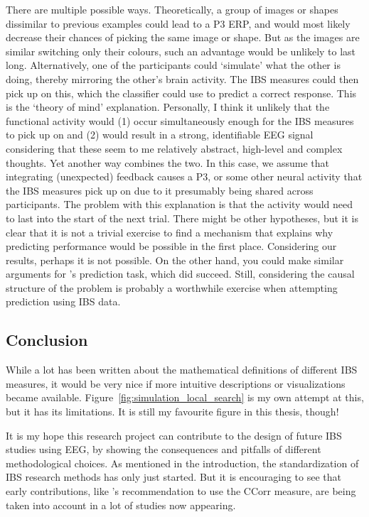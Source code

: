 There are multiple possible ways. Theoretically, a group of images or shapes dissimilar to
previous examples could lead to a P3 ERP, and would most likely decrease their
chances of picking the same image or shape. But as the images are similar switching only
their colours, such an advantage would be unlikely to last long. Alternatively,
one of the participants could `simulate' what the other is doing, thereby
mirroring the other's brain activity. The IBS measures could then pick up on
this, which the classifier could use to predict a correct response. This is the
`theory of mind' explanation. Personally, I think it unlikely that the
functional activity would (1) occur simultaneously enough for the IBS measures
to pick up on and (2) would result in a strong, identifiable EEG signal
considering that these seem to me relatively abstract, high-level and complex
thoughts. Yet another way combines the two. In this case, we assume that
integrating (unexpected) feedback causes a P3, or some other neural activity
that the IBS measures pick up on due to it presumably being shared across
participants. The problem with this explanation is that the activity would need
to last into the start of the next trial. There might be other hypotheses, but
it is clear that it is not a trivial exercise to find a mechanism that explains
why predicting performance would be possible in the first place. Considering
our results, perhaps it is not possible. On the other hand, you could make similar
arguments for \textcite{de_vico_fallani_defecting_2010}'s prediction task, which
did succeed. Still, considering the causal structure of the problem is probably
a worthwhile exercise when attempting prediction using IBS data.

\subsection{Conclusion}
While a lot has been written about the mathematical definitions of different
IBS measures, it would be very nice if more intuitive descriptions or
visualizations became available. Figure~\ref{fig:simulation_local_search} is my
own attempt at this, but it has its limitations. It is still my favourite
figure in this thesis, though!

It is my hope this research project can contribute to the design of future IBS
studies using EEG, by showing the consequences and pitfalls of different
methodological choices. As mentioned in the introduction, the standardization of
IBS research methods has only just started. But it is encouraging to see that
early contributions, like \textcite{burgess_interpretation_2013}'s
recommendation to use the CCorr measure, are being taken into account in a lot
of studies now appearing.
